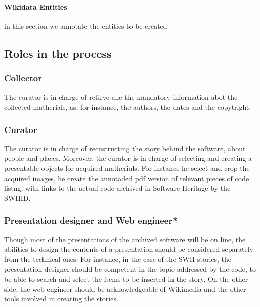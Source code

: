 \documentclass[]{article}
\begin{document}
\hypertarget{wikidata-entities}{%
\paragraph{Wikidata Entities}\label{wikidata-entities}}

in this section we annotate the entities to be created

\hypertarget{roles-in-the-process}{%
\subsection{Roles in the process}\label{roles-in-the-process}}

\hypertarget{collector}{%
\subsubsection{\texorpdfstring{\textbf{Collector}}{Collector}}\label{collector}}

The curator is in charge of retirve alle the mandatory information abot
the collected matherials, as, for instance, the authors, the dates and
the copytright.

\hypertarget{curator}{%
\subsubsection{\texorpdfstring{\textbf{Curator}}{Curator}}\label{curator}}

The curator is in charge of recustructing the story behind the software,
about people and places. Moreover, the curator is in charge of selecting
and creating a presentable objects for acquired matherials. For instance
he select and crop the acquired images, he create the annotaded pdf
version of relevant pieces of code listng, with links to the actual code
archived in Software Heritage by the SWHID.

\hypertarget{presentation-designer-and-web-engineer}{%
\subsubsection{\texorpdfstring{\textbf{Presentation designer and Web
engineer}*}{Presentation designer and Web engineer*}}\label{presentation-designer-and-web-engineer}}

Though most of the presentations of the archived software will be on
line, the abilities to design the contents of a presentation should be
considered separately from the technical ones. For instance, in the case
of the SWH-stories, the presentation designer should be competent in the
topic addressed by the code, to be able to search and select the items
to be inserted in the story. On the other side, the web engineer should
be acknowledgeable of Wikimedia and the other tools involved in creating
the stories.
\end{document}
